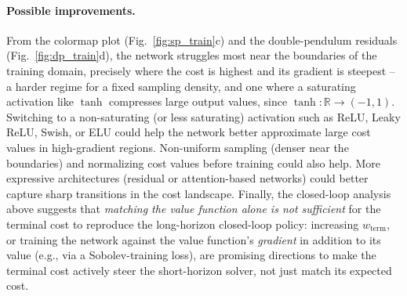 \documentclass[11pt,a4paper]{article}
\begin{document}
\paragraph{Possible improvements.} From the colormap plot (Fig.~\ref{fig:sp_train}c) and the
double-pendulum residuals (Fig.~\ref{fig:dp_train}d), the network struggles most near the
boundaries of the training domain, precisely where the cost is highest and its gradient is
steepest -- a harder regime for a fixed sampling density, and one where a saturating activation
like $\tanh$ compresses large output values, since $\tanh: \mathbb{R} \to (-1,1)$. Switching to a
non-saturating (or less saturating) activation such as ReLU, Leaky ReLU, Swish, or ELU could help
the network better approximate large cost values in high-gradient regions. Non-uniform sampling
(denser near the boundaries) and normalizing cost values before training could also help. More
expressive architectures (residual or attention-based networks) could better capture sharp
transitions in the cost landscape. Finally, the closed-loop analysis above suggests that
\emph{matching the value function alone is not sufficient} for the terminal cost to reproduce the
long-horizon closed-loop policy: increasing $w_{\text{term}}$, or training the network against
the value function's \emph{gradient} in addition to its value (e.g., via a Sobolev-training loss),
are promising directions to make the terminal cost actively steer the short-horizon solver, not
just match its expected cost.
\end{document}
